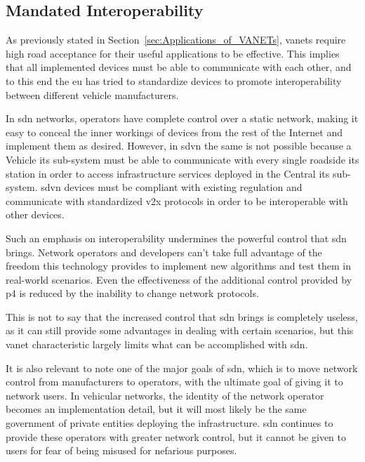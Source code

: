 \subsection{Mandated Interoperability}
\label{subsub:mandated_interoperability}

As previously stated in Section~\ref{sec:Applications_of_VANETs}, \glspl{vanet} require high road acceptance for their useful applications to be effective. This implies that all implemented devices must be able to communicate with each other, and to this end the \gls{eu} has tried to standardize devices to promote interoperability between different vehicle manufacturers.

In \gls{sdn} networks, operators have complete control over a static network, making it easy to conceal the inner workings of devices from the rest of the Internet and implement them as desired. However, in \gls{sdvn} the same is not possible because a Vehicle \gls{its} sub-system must be able to communicate with every single roadside \gls{its} station in order to access infrastructure services deployed in the Central \gls{its} sub-system. \gls{sdvn} devices must be compliant with existing regulation and communicate with standardized \gls{v2x} protocols in order to be interoperable with other devices.

Such an emphasis on interoperability undermines the powerful control that \gls{sdn} brings. Network operators and developers can't take full advantage of the freedom this technology provides to implement new algorithms and test them in real-world scenarios. Even the effectiveness of the additional control provided by \gls{p4} is reduced by the inability to change network protocols.

This is not to say that the increased control that \gls{sdn} brings is completely useless, as it can still provide some advantages in dealing with certain scenarios, but this \gls{vanet} characteristic largely limits what can be accomplished with \gls{sdn}. 

It is also relevant to note one of the major goals of \gls{sdn}, which is to move network control from manufacturers to operators, with the ultimate goal of giving it to network users. In vehicular networks, the identity of the network operator becomes an implementation detail, but it will most likely be the same government of private entities deploying the infrastructure. \gls{sdn} continues to provide these operators with greater network control, but it cannot be given to users for fear of being misused for nefarious purposes.

